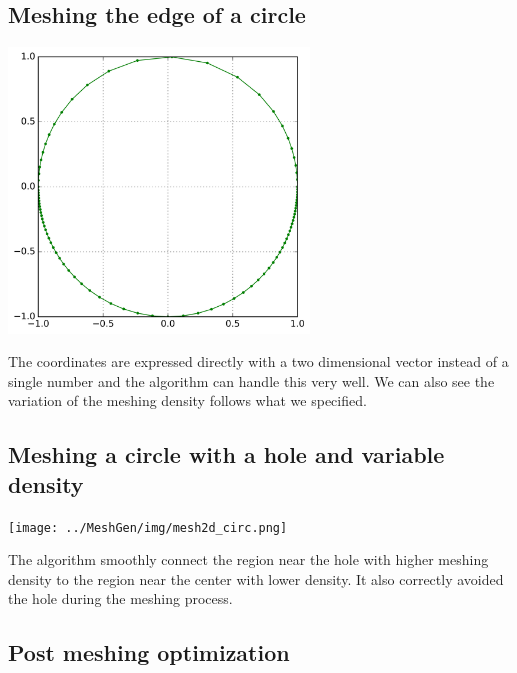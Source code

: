 \documentclass[10pt,fleqn]{article}
\begin{document}
\subsection{Meshing the edge of a circle}

\begin{center}
  \includegraphics[width=8cm]{../MeshGen/img/mesh1d.png}
\end{center}

The coordinates are expressed directly with a two dimensional vector instead
of a single number and the algorithm can handle this very well. We can also see
the variation of the meshing density follows what we specified.

\subsection{Meshing a circle with a hole and variable density}

\begin{center}
  \texttt{[image: ../MeshGen/img/mesh2d\_circ.png]}
\end{center}

The algorithm smoothly connect the region near the hole with higher meshing
density to the region near the center with lower density. It also correctly
avoided the hole during the meshing process.

\subsection{Post meshing optimization}
\end{document}
